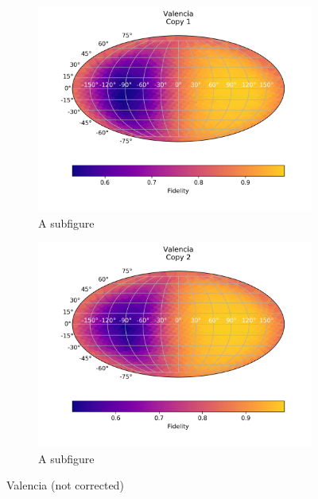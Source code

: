 \begin{figure}[H]
    \centering
    \begin{subfigure}{.5\textwidth}
      \centering
      \includegraphics[width=\textwidth]{Figures/Economical/IBM/FullSphere/results_valencia.txt_copy1.png}
      \caption{A subfigure}
      \label{fig:ec_valencia_sphere_1}
    \end{subfigure}%
    \begin{subfigure}{.5\textwidth}
      \centering
      \includegraphics[width=\textwidth]{Figures/Economical/IBM/FullSphere/results_valencia.txt_copy2.png}
      \caption{A subfigure}
      \label{fig:ec_valencia_sphere_2}
    \end{subfigure}
    \caption{Valencia (not corrected)}
    \label{fig:ec_valencia_sphere}
\end{figure}

